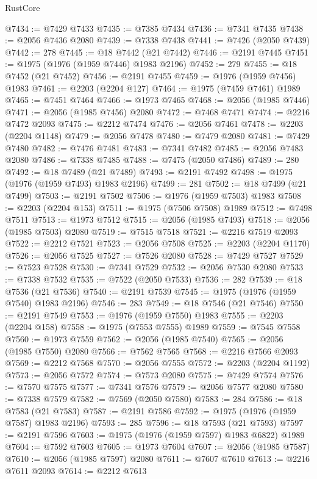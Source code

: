 \begin{lexlean}{RustCore}
\begin{coremodule}
@7434 := @7429 @7433
@7435 := @7385 @7434
@7436 := @7341 @7435
@7438 := @2056 @7436 @2080
@7439 := @7338 @7438
@7441 := @7426 (@2050 @7439)
@7442 := 278
@7445 := @18 @7442 (@21 @7442)
@7446 := @2191 @7445
@7451 := @1975 (@1976 (@1959 @7446) @1983 @2196)
@7452 := 279
@7455 := @18 @7452 (@21 @7452)
@7456 := @2191 @7455
@7459 := @1976 (@1959 @7456) @1983
@7461 := @2203 (@2204 @127)
@7464 := @1975 (@7459 @7461) @1989
@7465 := @7451 @7464
@7466 := @1973 @7465
@7468 := @2056 (@1985 @7446)
@7471 := @2056 (@1985 @7456) @2080
@7472 := @7468 @7471
@7474 := @2216 @7472 @2093
@7475 := @2212 @7474
@7476 := @2056 @7461
@7478 := @2203 (@2204 @1148)
@7479 := @2056 @7478
@7480 := @7479 @2080
@7481 := @7429 @7480
@7482 := @7476 @7481
@7483 := @7341 @7482
@7485 := @2056 @7483 @2080
@7486 := @7338 @7485
@7488 := @7475 (@2050 @7486)
@7489 := 280
@7492 := @18 @7489 (@21 @7489)
@7493 := @2191 @7492
@7498 := @1975 (@1976 (@1959 @7493) @1983 @2196)
@7499 := 281
@7502 := @18 @7499 (@21 @7499)
@7503 := @2191 @7502
@7506 := @1976 (@1959 @7503) @1983
@7508 := @2203 (@2204 @153)
@7511 := @1975 (@7506 @7508) @1989
@7512 := @7498 @7511
@7513 := @1973 @7512
@7515 := @2056 (@1985 @7493)
@7518 := @2056 (@1985 @7503) @2080
@7519 := @7515 @7518
@7521 := @2216 @7519 @2093
@7522 := @2212 @7521
@7523 := @2056 @7508
@7525 := @2203 (@2204 @1170)
@7526 := @2056 @7525
@7527 := @7526 @2080
@7528 := @7429 @7527
@7529 := @7523 @7528
@7530 := @7341 @7529
@7532 := @2056 @7530 @2080
@7533 := @7338 @7532
@7535 := @7522 (@2050 @7533)
@7536 := 282
@7539 := @18 @7536 (@21 @7536)
@7540 := @2191 @7539
@7545 := @1975 (@1976 (@1959 @7540) @1983 @2196)
@7546 := 283
@7549 := @18 @7546 (@21 @7546)
@7550 := @2191 @7549
@7553 := @1976 (@1959 @7550) @1983
@7555 := @2203 (@2204 @158)
@7558 := @1975 (@7553 @7555) @1989
@7559 := @7545 @7558
@7560 := @1973 @7559
@7562 := @2056 (@1985 @7540)
@7565 := @2056 (@1985 @7550) @2080
@7566 := @7562 @7565
@7568 := @2216 @7566 @2093
@7569 := @2212 @7568
@7570 := @2056 @7555
@7572 := @2203 (@2204 @1192)
@7573 := @2056 @7572
@7574 := @7573 @2080
@7575 := @7429 @7574
@7576 := @7570 @7575
@7577 := @7341 @7576
@7579 := @2056 @7577 @2080
@7580 := @7338 @7579
@7582 := @7569 (@2050 @7580)
@7583 := 284
@7586 := @18 @7583 (@21 @7583)
@7587 := @2191 @7586
@7592 := @1975 (@1976 (@1959 @7587) @1983 @2196)
@7593 := 285
@7596 := @18 @7593 (@21 @7593)
@7597 := @2191 @7596
@7603 := @1975 (@1976 (@1959 @7597) @1983 @6822) @1989
@7604 := @7592 @7603
@7605 := @1973 @7604
@7607 := @2056 (@1985 @7587)
@7610 := @2056 (@1985 @7597) @2080
@7611 := @7607 @7610
@7613 := @2216 @7611 @2093
@7614 := @2212 @7613

\end{coremodule}
\end{lexlean}
